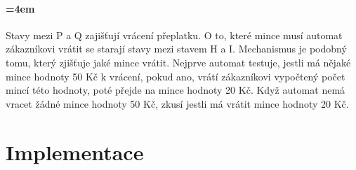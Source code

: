 \documentclass[12pt,a4paper]{article}
\begin{document}
\paragraph{\parindent=4em}{	
	Stavy mezi P a Q zajišťují vrácení přeplatku. O to, které mince musí automat zákazníkovi vrátit se starají stavy mezi stavem H a I. Mechanismus je podobný tomu, který zjišťuje jaké mince vrátit. Nejprve automat testuje, jestli má nějaké mince hodnoty 50 Kč k vrácení, pokud ano, vrátí zákazníkovi vypočtený počet mincí této hodnoty, poté přejde na mince hodnoty 20 Kč. Když automat nemá vracet žádné mince hodnoty 50 Kč, zkusí jestli má vrátit mince hodnoty 20 Kč.
}	

\section{Implementace}


%
%
\end{document}

